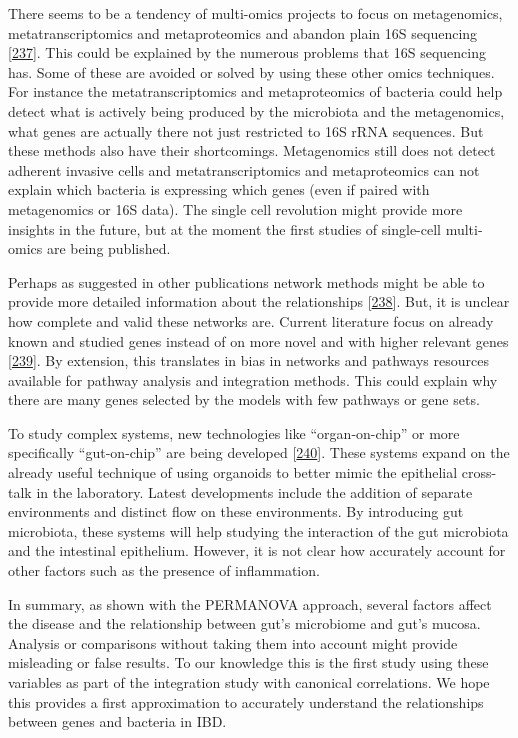 \documentclass[
  12pt,
  a4paper,
  twoside,
  openright]{book}
\begin{document}
There seems to be a tendency of multi-omics projects to focus on metagenomics, metatranscriptomics and metaproteomics and abandon plain 16S sequencing {[}\protect\hyperlink{ref-zhang2019}{237}{]}.
This could be explained by the numerous problems that 16S sequencing has.
Some of these are avoided or solved by using these other omics techniques.
For instance the metatranscriptomics and metaproteomics of bacteria could help detect what is actively being produced by the microbiota and the metagenomics, what genes are actually there not just restricted to 16S rRNA sequences.
But these methods also have their shortcomings.
Metagenomics still does not detect adherent invasive cells and metatranscriptomics and metaproteomics can not explain which bacteria is expressing which genes (even if paired with metagenomics or 16S data).
The single cell revolution might provide more insights in the future, but at the moment the first studies of single-cell multi-omics are being published.

Perhaps as suggested in other publications network methods might be able to provide more detailed information about the relationships {[}\protect\hyperlink{ref-jiang2019}{238}{]}.
But, it is unclear how complete and valid these networks are.
Current literature focus on already known and studied genes instead of on more novel and with higher relevant genes {[}\protect\hyperlink{ref-haynes2018}{239}{]}.
By extension, this translates in bias in networks and pathways resources available for pathway analysis and integration methods.
This could explain why there are many genes selected by the models with few pathways or gene sets.

To study complex systems, new technologies like ``organ-on-chip'' or more specifically ``gut-on-chip'' are being developed {[}\protect\hyperlink{ref-collij2021}{240}{]}.
These systems expand on the already useful technique of using organoids to better mimic the epithelial cross-talk in the laboratory.
Latest developments include the addition of separate environments and distinct flow on these environments.
By introducing gut microbiota, these systems will help studying the interaction of the gut microbiota and the intestinal epithelium.
However, it is not clear how accurately account for other factors such as the presence of inflammation.

In summary, as shown with the PERMANOVA approach, several factors affect the disease and the relationship between gut's microbiome and gut's mucosa.
Analysis or comparisons without taking them into account might provide misleading or false results.
To our knowledge this is the first study using these variables as part of the integration study with canonical correlations.
We hope this provides a first approximation to accurately understand the relationships between genes and bacteria in IBD.
\end{document}
